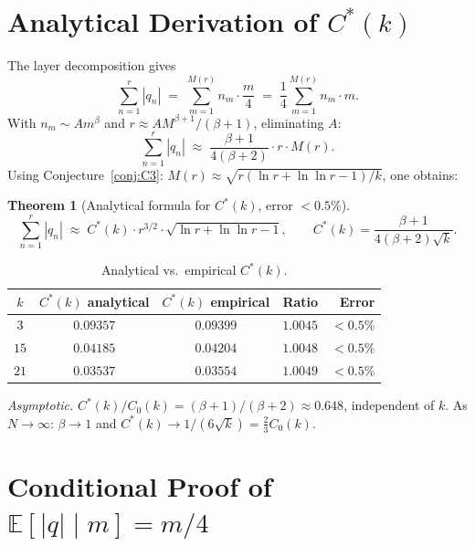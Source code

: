 \documentclass[11pt,a4paper]{article}
\newtheorem{theorem}{Theorem}[section]
\theoremstyle{definition}
\theoremstyle{remark}
\newcommand{\E}{\mathbb{E}}
\begin{document}
\section{Analytical Derivation of $C^{*}(k)$}\label{sec:Cstar}

The layer decomposition gives
\[
  \sum_{n=1}^{r}|q_{n}|
  \;=\;\sum_{m=1}^{M(r)}n_{m}\cdot\frac{m}{4}
  \;=\;\frac{1}{4}\sum_{m=1}^{M(r)}n_{m}\cdot m.
\]
With $n_{m}\sim Am^{\beta}$ and $r\approx AM^{\beta+1}/(\beta+1)$,
eliminating $A$:
\[
  \sum_{n=1}^{r}|q_{n}|\;\approx\;\frac{\beta+1}{4(\beta+2)}\cdot r\cdot M(r).
\]
Using Conjecture~\ref{conj:C3}:
$M(r)\approx\sqrt{r(\ln r+\ln\ln r-1)/k}$, one obtains:

\begin{heuristicbox}
\begin{theorem}[Analytical formula for $C^{*}(k)$, error $<0.5\%$]
\label{thm:Cstar}
\[
  \sum_{n=1}^{r}|q_{n}|\;\approx\;C^{*}(k)\cdot r^{3/2}\cdot
  \sqrt{\ln r+\ln\ln r-1},
  \qquad C^{*}(k)=\frac{\beta+1}{4(\beta+2)\sqrt{k}}.
\]
\end{theorem}
\end{heuristicbox}

\begin{table}[ht]\centering
\caption{Analytical vs.\ empirical $C^{*}(k)$.}
\begin{tabular}{@{}cccrr@{}}
\toprule
$k$ & $C^{*}(k)$ analytical & $C^{*}(k)$ empirical & Ratio & Error \\
\midrule
$3$ & $0.09357$ & $0.09399$ & $1.0045$ & $<0.5\%$ \\
$15$ & $0.04185$ & $0.04204$ & $1.0048$ & $<0.5\%$ \\
$21$ & $0.03537$ & $0.03554$ & $1.0049$ & $<0.5\%$ \\
\bottomrule
\end{tabular}
\end{table}

\smallskip
\noindent\emph{Asymptotic.}
$C^{*}(k)/C_{0}(k)=(\beta+1)/(\beta+2)\approx 0.648$, independent of
$k$. As $N\to\infty$: $\beta\to 1$ and
$C^{*}(k)\to 1/(6\sqrt{k})=\tfrac{2}{3}C_{0}(k)$.

\section{Conditional Proof of $\E[|q|\mid m]=m/4$}\label{sec:cond-proof}
\end{document}
